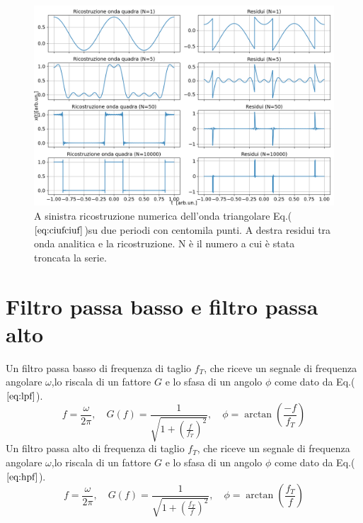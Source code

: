 \documentclass{article}
\begin{document}
    \begin{figure}[H]
        \centering
        \includegraphics[width=1.2\textwidth]{foupulsetrainwave1e5.png} %
        \caption{A sinistra ricostruzione numerica dell'onda triangolare
        Eq.($\ref{eq:ciufciuf}$)su due periodi con centomila punti.
        A destra residui tra onda analitica e la ricostruzione.
        N è il numero a cui è stata troncata la serie. }
        \label{fig:ciufciuf2}
    \end{figure}


        
        
    
%
\section{Filtro passa basso e filtro passa alto}
Un filtro passa basso di frequenza di taglio $f_T$, che riceve un segnale di 
frequenza angolare $\omega$,lo riscala di un fattore $G$ e lo sfasa di un 
angolo $\phi$ come dato da Eq.($\ref{eq:lpf}$).
    \begin{equation}
        f = \frac{\omega}{2\pi}, \quad 
        G(f) = \frac{1}{\sqrt{1 + \left(\frac{f}{f_T}\right)^2}}, \quad 
        \phi = \arctan\left(\frac{-f}{f_T}\right)
        \label{eq:lpf}
    \end{equation}
Un filtro passa alto di frequenza di taglio $f_T$, che riceve un segnale di 
frequenza angolare $\omega$,lo riscala di un fattore $G$ e lo sfasa di un 
angolo $\phi$ come dato da Eq.($\ref{eq:hpf}$).
    \begin{equation}
        f = \frac{\omega}{2\pi}, \quad 
        G(f) = \frac{1}{\sqrt{1 + \left(\frac{f_T}{f}\right)^2}}, \quad 
        \phi = \arctan\left(\frac{f_T}{f}\right)
        \label{eq:hpf}
    \end{equation}
\end{document}
